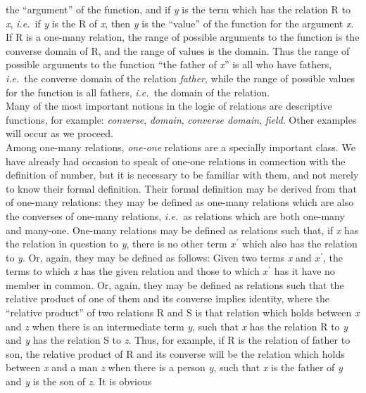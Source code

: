 {the ``argument'' of the function, and if \textit{y} is the term which
has the relation R to \textit{x},
\textit{i.e.}\ if \textit{y} is
the R of \textit{x},
then \textit{y} is
the ``value''
of the function for the argument \textit{x}.
If R is a one-many relation, the
range of possible arguments to the function is the converse domain of
R, and the range of values is the domain. Thus the range of possible
arguments to the function ``the father of \textit{x}'' is all who have
fathers,
\textit{i.e.}\ the
converse domain of the relation \textit{father},
while the range of
possible values for the function is all fathers, \textit{i.e.}\ the domain of
the
relation.\\
\indent Many of the most important notions in the logic of
relations
are
descriptive functions, for example: \textit{converse}, \textit{domain}, \textit{converse domain},
\textit{field}.
Other examples will occur as we proceed.\\
\indent Among one-many relations, \textit{one-one}
relations are a specially
important
class. We have already had occasion to speak of one-one relations in
connection with the definition of number, but it is necessary to be
familiar with them, and not merely to know their formal definition.
Their formal definition may be derived from that of one-many relations:
they may be defined as one-many relations which are also the converses
of one-many relations, \textit{i.e.}\ as relations which are both one-many and
many-one. One-many relations may be defined as relations such that, if
\textit{x} has
the
relation in question to \textit{y},
there is no other term $x^\prime$
which
also has the relation to \textit{y}.
Or, again, they may be defined as follows:
Given two terms \textit{x}
and $x^\prime$,
the terms to which \textit{x}
has the given relation
and those to which $x^\prime$
has it have no member in common. Or, again, they
may be defined as relations such that the relative product of one of
them and its converse implies identity, where the ``relative product'' of
two relations R and S is that relation which holds between \textit{x} 
and \textit{z} when
there is an intermediate term \textit{y},
such that \textit{x}
has the relation R to \textit{y}
and \textit{y} has
the relation S to \textit{z}.
Thus, for example, if R is the relation
of father to son, the relative product of R and its converse will be
the relation which holds between \textit{x}
and a man \textit{z}
when there is a person
\textit{y},
such
that \textit{x} is
the father of \textit{y}
and \textit{y} is
the son of \textit{z}.
It is obvious
}
